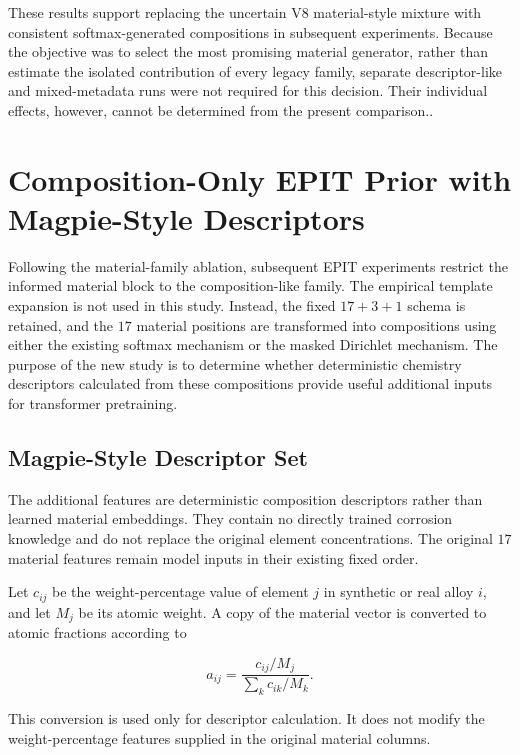 \documentclass{article}
\begin{document}
These results support replacing the uncertain V8 material-style mixture with consistent softmax-generated compositions in subsequent experiments. Because the objective was to select the most promising material generator, rather than estimate the isolated contribution of every legacy family, separate descriptor-like and mixed-metadata runs were not required for this decision. Their individual effects, however, cannot be determined from the present comparison..


\section{Composition-Only EPIT Prior with Magpie-Style Descriptors}
\label{sec:composition-magpie-study}

Following the material-family ablation, subsequent EPIT experiments restrict
the informed material block to the composition-like family. The empirical
template expansion is not used in this study. Instead, the fixed
\(17+3+1\) schema is retained, and the \(17\) material positions are transformed
into compositions using either the existing softmax mechanism or the masked
Dirichlet mechanism. The purpose of the new study is to determine whether
deterministic chemistry descriptors calculated from these compositions provide
useful additional inputs for transformer pretraining.

\subsection{Magpie-Style Descriptor Set}

The additional features are deterministic composition descriptors rather than
learned material embeddings. They contain no directly trained corrosion
knowledge and do not replace the original element concentrations. The original
\(17\) material features remain model inputs in their existing fixed order.

Let \(c_{ij}\) be the weight-percentage value of element \(j\) in synthetic or
real alloy \(i\), and let \(M_j\) be its atomic weight. A copy of the material
vector is converted to atomic fractions according to

\begin{equation}
a_{ij}
=
\frac{c_{ij}/M_j}
{\sum_k c_{ik}/M_k}.
\label{eq:magpie-atomic-fractions}
\end{equation}

This conversion is used only for descriptor calculation. It does not modify the
weight-percentage features supplied in the original material columns.
\end{document}
